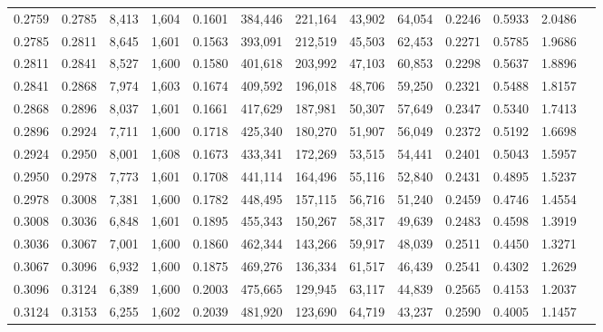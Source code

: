 \begin{tabular}{rrrrrrrrrrrrr}
0.2759 & 0.2785 &  8,413 & 1,604 &                                     0.1601 & 384,446 & 221,164 &  43,902 &  64,054 & 0.2246 & 0.5933 & 2.0486 \\
0.2785 & 0.2811 &  8,645 & 1,601 &                                     0.1563 & 393,091 & 212,519 &  45,503 &  62,453 & 0.2271 & 0.5785 & 1.9686 \\
0.2811 & 0.2841 &  8,527 & 1,600 &                                     0.1580 & 401,618 & 203,992 &  47,103 &  60,853 & 0.2298 & 0.5637 & 1.8896 \\
0.2841 & 0.2868 &  7,974 & 1,603 &                                     0.1674 & 409,592 & 196,018 &  48,706 &  59,250 & 0.2321 & 0.5488 & 1.8157 \\
0.2868 & 0.2896 &  8,037 & 1,601 &                                     0.1661 & 417,629 & 187,981 &  50,307 &  57,649 & 0.2347 & 0.5340 & 1.7413 \\
0.2896 & 0.2924 &  7,711 & 1,600 &                                     0.1718 & 425,340 & 180,270 &  51,907 &  56,049 & 0.2372 & 0.5192 & 1.6698 \\
0.2924 & 0.2950 &  8,001 & 1,608 &                                     0.1673 & 433,341 & 172,269 &  53,515 &  54,441 & 0.2401 & 0.5043 & 1.5957 \\
0.2950 & 0.2978 &  7,773 & 1,601 &                                     0.1708 & 441,114 & 164,496 &  55,116 &  52,840 & 0.2431 & 0.4895 & 1.5237 \\
0.2978 & 0.3008 &  7,381 & 1,600 &                                     0.1782 & 448,495 & 157,115 &  56,716 &  51,240 & 0.2459 & 0.4746 & 1.4554 \\
0.3008 & 0.3036 &  6,848 & 1,601 &                                     0.1895 & 455,343 & 150,267 &  58,317 &  49,639 & 0.2483 & 0.4598 & 1.3919 \\
0.3036 & 0.3067 &  7,001 & 1,600 &                                     0.1860 & 462,344 & 143,266 &  59,917 &  48,039 & 0.2511 & 0.4450 & 1.3271 \\
0.3067 & 0.3096 &  6,932 & 1,600 &                                     0.1875 & 469,276 & 136,334 &  61,517 &  46,439 & 0.2541 & 0.4302 & 1.2629 \\
0.3096 & 0.3124 &  6,389 & 1,600 &                                     0.2003 & 475,665 & 129,945 &  63,117 &  44,839 & 0.2565 & 0.4153 & 1.2037 \\
0.3124 & 0.3153 &  6,255 & 1,602 &                                     0.2039 & 481,920 & 123,690 &  64,719 &  43,237 & 0.2590 & 0.4005 & 1.1457 \\

\end{tabular}
